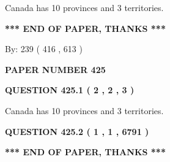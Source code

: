\documentclass[12pt]{article}
\begin{document}
 
Canada has 10  provinces and 3 territories.
 
 
 
 
   
   
 \vspace{0.2in}
 
   
   
   
   
\vspace{1.0in} 
{\textbf{\large{ *** END OF PAPER, THANKS *** }}} 
   
   
\hspace{1.0in} By: 
 239 ( 416 ,  613 )
   
   
   
   
\newpage 
\setcounter{page}{ 
   425001 } 
   
   
   
   
 {\textbf{ \Large{ PAPER NUMBER  425  }}}
   
   
\vspace{0.2in}
   
   
   
   
   
   
 \vspace{0.2in}
 
 
 
 
   
   
  
\vspace{0.2in}
  
{\textbf{\Large{QUESTION
425.1 
 ( 2 , 2 , 3 )
}}}
  
  
 
 
\noindent{}
 
 
Canada has 10  provinces and 3 territories.
 
 
 
 
  
\vspace{0.2in}
  
{\textbf{\Large{QUESTION
425.2 
 ( 1 , 1 , 6791 )
}}}
  
  
   
   
 \vspace{0.2in}
 
   
   
   
   
\vspace{1.0in} 
{\textbf{\large{ *** END OF PAPER, THANKS *** }}} 
   
\end{document}
